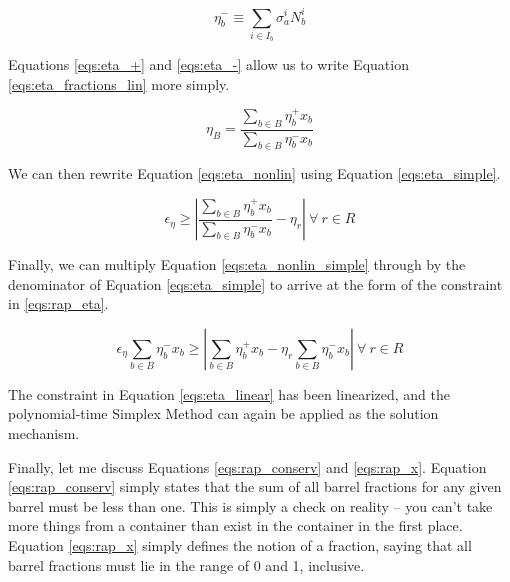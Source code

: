 \begin{equation}
\label{eqs:eta_-}
\eta_{b}^{-} \equiv \sum_{i \in I_{b}} \sigma_{a}^{i} N_{b}^{i}
\end{equation}

Equations \ref{eqs:eta_+} and \ref{eqs:eta_-} allow us to write
Equation \ref{eqs:eta_fractions_lin} more simply.

\begin{equation}
\label{eqs:eta_simple}
\eta_{B} = \frac{\sum_{b \in B} \eta_{b}^{+} x_{b}}
                {\sum_{b \in B} \eta_{b}^{-} x_{b}}
\end{equation}

We can then rewrite Equation \ref{eqs:eta_nonlin} using
Equation \ref{eqs:eta_simple}.

\begin{equation}
\label{eqs:eta_nonlin_simple}
\epsilon_{\eta} \geq \left| 
\frac{\sum_{b \in B} \eta_{b}^{+} x_{b}}
     {\sum_{b \in B} \eta_{b}^{-} x_{b}}
- \eta_{r} \right|
\: \forall \: r \in R
\end{equation}

Finally, we can multiply Equation \ref{eqs:eta_nonlin_simple} through by the
denominator of Equation \ref{eqs:eta_simple} to arrive at the form of the
constraint in \ref{eqs:rap_eta}.

\begin{equation}
\label{eqs:eta_linear}
\epsilon_{\eta} \sum_{b \in B} \eta_{b}^{-} x_{b} \geq
\left| \sum_{b \in B} \eta_{b}^{+} x_{b}
- \eta_{r} \sum_{b \in B} \eta_{b}^{-} x_{b} \right|
\: \forall \: r \in R
\end{equation}

The constraint in Equation \ref{eqs:eta_linear} has been linearized, and the
polynomial-time Simplex Method can again be applied as the solution mechanism. 

Finally, let me discuss Equations \ref{eqs:rap_conserv} and \ref{eqs:rap_x}.
Equation \ref{eqs:rap_conserv} simply states that the sum of all barrel
fractions for any given barrel must be less than one. This is simply a check on
reality -- you can't take more things from a container than exist in the
container in the first place. Equation \ref{eqs:rap_x} simply defines the notion of
a fraction, saying that all barrel fractions must lie in the range of 0 and 1,
inclusive.
